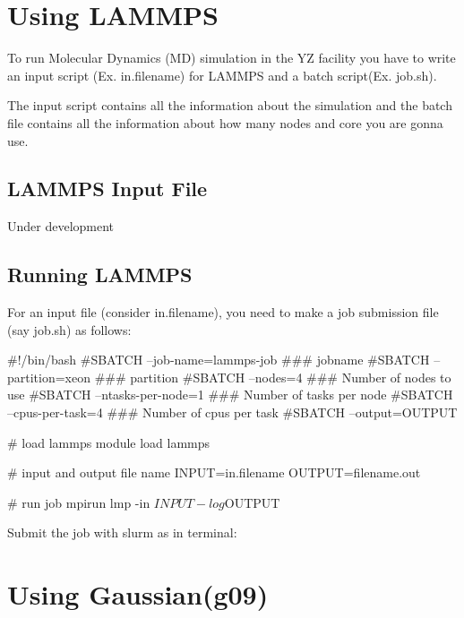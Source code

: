 \documentclass{book}
\begin{document}
\chapter{Using LAMMPS}%
\label{cha:using_lammps}

To run Molecular Dynamics (MD) simulation in the YZ facility you have to write an input script (Ex. in.filename) for LAMMPS and a batch script(Ex. job.sh).

The input script contains all the information about the simulation and the batch file contains all the information about how many nodes and core you are gonna use.

\section{LAMMPS Input File}%
\label{sec:lammps_input_file}

Under development

\section{Running LAMMPS}%
\label{sec:running_lammps}

For an input file (consider in.filename), you need to make a job submission file (say job.sh) as follows:

\begin{myverbatim}
	#!/bin/bash
	#SBATCH --job-name=lammps-job 	### jobname
	#SBATCH --partition=xeon	### partition
	#SBATCH --nodes=4 		### Number of nodes to use
	#SBATCH --ntasks-per-node=1 	### Number of tasks per node
	#SBATCH --cpus-per-task=4 	### Number of cpus per task
	#SBATCH --output=OUTPUT%

	# load lammps
	module load lammps

	# input and output file name
	INPUT=in.filename
	OUTPUT=filename.out

	# run job
	mpirun lmp -in ${INPUT} -log ${OUTPUT}

\end{myverbatim}

Submit the job with slurm as in terminal:



\chapter{Using Gaussian(g09)}%
\label{cha:using_gaussian_g09_}
\end{document}
